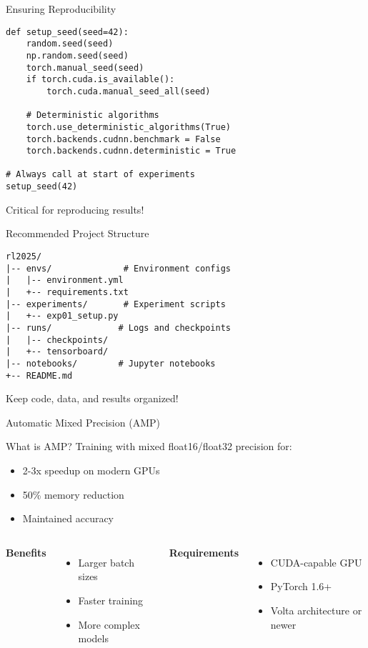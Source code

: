 \documentclass[aspectratio=169,10pt]{beamer}
\begin{document}
\begin{frame}[fragile]{Ensuring Reproducibility}
\begin{lstlisting}
def setup_seed(seed=42):
    random.seed(seed)
    np.random.seed(seed)
    torch.manual_seed(seed)
    if torch.cuda.is_available():
        torch.cuda.manual_seed_all(seed)
    
    # Deterministic algorithms
    torch.use_deterministic_algorithms(True)
    torch.backends.cudnn.benchmark = False
    torch.backends.cudnn.deterministic = True

# Always call at start of experiments
setup_seed(42)
\end{lstlisting}

Critical for reproducing results!
\end{frame}

\begin{frame}[fragile]{Recommended Project Structure}
\begin{lstlisting}
rl2025/
|-- envs/              # Environment configs
|   |-- environment.yml
|   +-- requirements.txt
|-- experiments/       # Experiment scripts
|   +-- exp01_setup.py
|-- runs/             # Logs and checkpoints
|   |-- checkpoints/
|   +-- tensorboard/
|-- notebooks/        # Jupyter notebooks
+-- README.md
\end{lstlisting}

Keep code, data, and results organized!
\end{frame}

\begin{frame}{Automatic Mixed Precision (AMP)}
\begin{block}{What is AMP?}
Training with mixed float16/float32 precision for:
\begin{itemize}
    \item 2-3x speedup on modern GPUs
    \item 50\% memory reduction
    \item Maintained accuracy
\end{itemize}
\end{block}

\begin{columns}
\textbf{Benefits}
\begin{itemize}
    \item Larger batch sizes
    \item Faster training
    \item More complex models
\end{itemize}

\textbf{Requirements}
\begin{itemize}
    \item CUDA-capable GPU
    \item PyTorch 1.6+
    \item Volta architecture or newer
\end{itemize}
\end{columns}
\end{frame}
\end{document}
